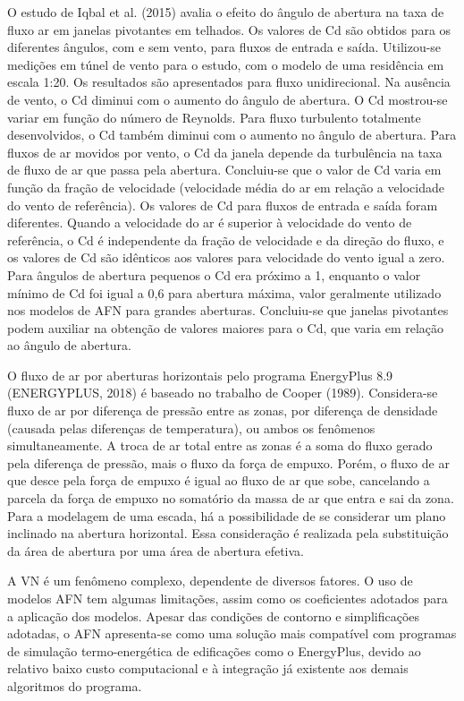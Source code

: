 \documentclass[brazil,hardcopy,openany,a5paper]{ufscthesis}
\begin{document}
	O estudo de Iqbal et al. (2015) avalia o efeito do ângulo de abertura na taxa de fluxo ar em janelas pivotantes em telhados. Os valores de Cd são obtidos para os diferentes ângulos, com e sem vento, para fluxos de entrada e saída. Utilizou-se medições em túnel de vento para o estudo, com o modelo de uma residência em escala 1:20. Os resultados são apresentados para fluxo unidirecional. Na ausência de vento, o Cd diminui com o aumento do ângulo de abertura. O Cd mostrou-se variar em função do número de Reynolds. Para fluxo turbulento totalmente desenvolvidos, o Cd também diminui com o aumento no ângulo de abertura. Para fluxos de ar movidos por vento, o Cd da janela depende da turbulência na taxa de fluxo de ar que passa pela abertura. Concluiu-se que o valor de Cd varia em função da fração de velocidade (velocidade média do ar em relação a velocidade do vento de referência). Os valores de Cd para fluxos de entrada e saída foram diferentes. Quando a velocidade do ar é superior à velocidade do vento de referência, o Cd é independente da fração de velocidade e da direção do fluxo, e os valores de Cd são idênticos aos valores para velocidade do vento igual a zero. Para ângulos de abertura pequenos o Cd era próximo a 1, enquanto o valor mínimo de Cd foi igual a 0,6 para abertura máxima, valor geralmente utilizado nos modelos de AFN para grandes aberturas. Concluiu-se que janelas pivotantes podem auxiliar na obtenção de valores maiores para o Cd, que varia em relação ao ângulo de abertura.
	
	O fluxo de ar por aberturas horizontais pelo programa EnergyPlus 8.9 (ENERGYPLUS, 2018) é baseado no trabalho de Cooper (1989). Considera-se fluxo de ar por diferença de pressão entre as zonas, por diferença de densidade (causada pelas diferenças de temperatura), ou ambos os fenômenos simultaneamente. A troca de ar total entre as zonas é a soma do fluxo gerado pela diferença de pressão, mais o fluxo da força de empuxo. Porém, o fluxo de ar que desce pela força de empuxo é igual ao fluxo de ar que sobe, cancelando a parcela da força de empuxo no somatório da massa de ar que entra e sai da zona. Para a modelagem de uma escada, há a possibilidade de se considerar um plano inclinado na abertura horizontal. Essa consideração é realizada pela substituição da área de abertura por uma área de abertura efetiva.
	
	A VN é um fenômeno complexo, dependente de diversos fatores. O uso de modelos AFN tem algumas limitações, assim como os coeficientes adotados para a aplicação dos modelos. Apesar das condições de contorno e simplificações adotadas, o AFN apresenta-se como uma solução mais compatível com programas de simulação termo-energética de edificações como o EnergyPlus, devido ao relativo baixo custo computacional e à integração já	existente aos demais algoritmos do programa.
	
\end{document}
